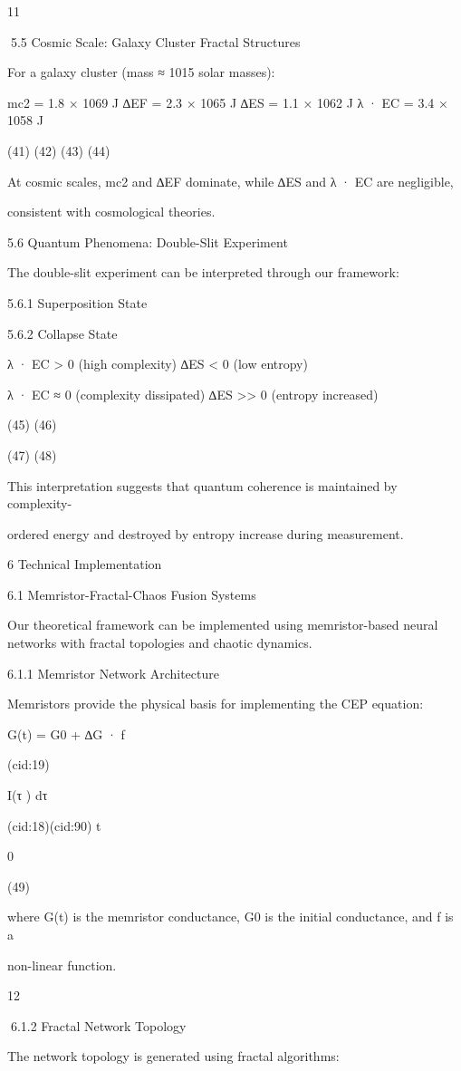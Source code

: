 11

5.5 Cosmic Scale: Galaxy Cluster Fractal Structures

For a galaxy cluster (mass ≈ 1015 solar masses):

mc2 = 1.8 × 1069 J
∆EF = 2.3 × 1065 J
∆ES = 1.1 × 1062 J
λ · EC = 3.4 × 1058 J

(41)
(42)
(43)
(44)

At cosmic scales, mc2 and ∆EF dominate, while ∆ES and λ · EC are negligible,

consistent with cosmological theories.

5.6 Quantum Phenomena: Double-Slit Experiment

The double-slit experiment can be interpreted through our framework:

5.6.1 Superposition State

5.6.2 Collapse State

λ · EC > 0 (high complexity)
∆ES < 0 (low entropy)

λ · EC ≈ 0 (complexity dissipated)
∆ES >> 0 (entropy increased)

(45)
(46)

(47)
(48)

This interpretation suggests that quantum coherence is maintained by complexity-

ordered energy and destroyed by entropy increase during measurement.

6 Technical Implementation

6.1 Memristor-Fractal-Chaos Fusion Systems

Our theoretical framework can be implemented using memristor-based neural networks
with fractal topologies and chaotic dynamics.

6.1.1 Memristor Network Architecture

Memristors provide the physical basis for implementing the CEP equation:

G(t) = G0 + ∆G · f

(cid:19)

I(τ ) dτ

(cid:18)(cid:90) t

0

(49)

where G(t) is the memristor conductance, G0 is the initial conductance, and f is a

non-linear function.

12

6.1.2 Fractal Network Topology

The network topology is generated using fractal algorithms:

